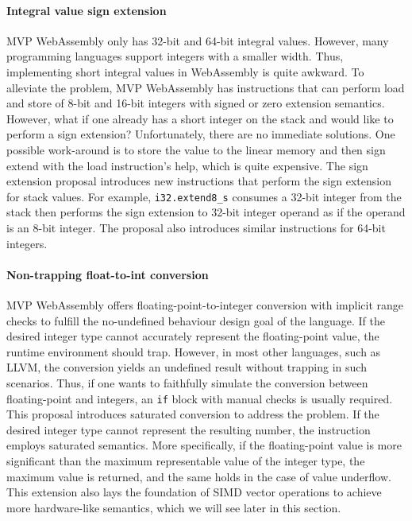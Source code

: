 \paragraph{Integral value sign extension}
MVP WebAssembly only has 32-bit and 64-bit integral values. However, many
programming languages support integers with a smaller width. Thus, implementing
short integral values in WebAssembly is quite awkward. To alleviate the problem,
MVP WebAssembly has instructions that can perform load and store of 8-bit and
16-bit integers with signed or zero extension semantics. However, what if one
already has a short integer on the stack and would like to perform a sign
extension?  Unfortunately, there are no immediate solutions. One possible
work-around is to store the value to the linear memory and then sign extend with
the load instruction's help, which is quite expensive. The sign extension
proposal introduces new instructions that perform the sign extension for stack
values. For example, \texttt{i32.extend8\_s} consumes a 32-bit integer from the
stack then performs the sign extension to 32-bit integer operand as if the
operand is an 8-bit integer. The proposal also introduces similar instructions
for 64-bit integers.

\paragraph{Non-trapping float-to-int conversion}
MVP WebAssembly offers floating-point-to-integer conversion with implicit range
checks to fulfill the no-undefined behaviour design goal of the language. If the
desired integer type cannot accurately represent the floating-point value, the
runtime environment should trap. However, in most other languages, such as LLVM,
the conversion yields an undefined result without trapping in such scenarios.
Thus, if one wants to faithfully simulate the conversion between floating-point
and integers, an \texttt{if} block with manual checks is usually required. This
proposal introduces saturated conversion to address the problem. If the desired
integer type cannot represent the resulting number, the instruction employs
saturated semantics. More specifically, if the floating-point value is more
significant than the maximum representable value of the integer type, the
maximum value is returned, and the same holds in the case of value underflow.
This extension also lays the foundation of SIMD vector operations to achieve
more hardware-like semantics, which we will see later in this section.

